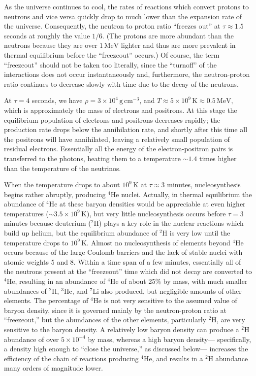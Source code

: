 As the universe continues to cool, the rates of reactions which convert protons to
neutrons and vice versa quickly drop to much lower than the expansion rate of the
universe. Consequently, the neutron to proton ratio ``freezes out'' at
\(\tau\approx1.5\) seconds at roughly the value \(1/6\). (The protons are more
abundant than the neutrons because they are over \(1\,\mathrm{MeV}\) lighter and thus
are more prevalent in thermal equilibrium before the ``freezeout'' occurs.) Of course,
the term ``freezeout'' should not be taken too literally, since the ``turnoff'' of the
interactions does not occur instantaneously and, furthermore, the neutron-proton ratio
continues to decrease slowly with time due to the decay of the neutrons.

At \(\tau=4\) seconds, we have \(\rho=3\times10^4\,\mathrm{g\,cm^{-3}}\), and
\(T\approx5\times10^9\,\mathrm{K}\approx0.5\,\mathrm{MeV}\), which is approximately
the mass of electrons and positrons. At this stage the equilibrium population of
electrons and positrons decreases rapidly; the production rate drops below the
annihilation rate, and shortly after this time all the positrons will have annihilated,
leaving a relatively small population of residual electrons. Essentially all the energy
of the electron-positron pairs is transferred to the photons, heating them to a
temperature \(\sim1.4\) times higher than the temperature of the neutrinos.

When the temperature drops to about \(10^9\,\mathrm{K}\) at \(\tau\approx3\) minutes,
nucleosynthesis begins rather abruptly, producing \({}^4\mathrm{He}\) nuclei. Actually,
in thermal equilibrium the abundance of \({}^4\mathrm{He}\) at these baryon densities
would be appreciable at even higher temperatures (\(\sim3.5\times10^9\,\mathrm{K}\)),
but very little nucleosynthesis occurs before \(\tau=3\) minutes because deuterium
(\({}^2\mathrm{H}\)) plays a key role in the nuclear reactions which build up helium,
but the equilibrium abundance of \({}^2\mathrm{H}\) is very low until the temperature
drops to \(10^9\,\mathrm{K}\). Almost no nucleosynthesis of elements beyond
\({}^4\mathrm{He}\) occurs because of the large Coulomb barriers and the lack of stable
nuclei with atomic weights 5 and 8. Within a time span of a few minutes, essentially
all of the neutrons present at the ``freezeout'' time which did not decay are converted
to \({}^4\mathrm{He}\), resulting in an abundance of \({}^4\mathrm{He}\) of about 25\% by
mass, with much smaller abundances of \({}^2\mathrm{H}\), \({}^3\mathrm{He}\), and
\({}^7\mathrm{Li}\) also produced, but negligible amounts of other elements. The
percentage of \({}^4\mathrm{He}\) is not very sensitive to the assumed value of baryon
density, since it is governed mainly by the neutron-proton ratio at ``freezeout,'' but
the abundances of the other elements, particularly \({}^2\mathrm{H}\), are very sensitive
to the baryon density. A relatively low baryon density can produce a \({}^2\mathrm{H}\)
abundance of over \(5\times10^{-4}\) by mass, whereas a high baryon density---
specifically, a density high enough to ``close the universe,'' as discussed below---
increases the efficiency of the chain of reactions producing \({}^4\mathrm{He}\), and
results in a \({}^2\mathrm{H}\) abundance many orders of magnitude lower.

